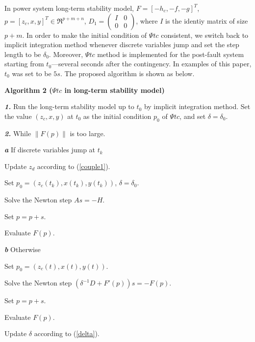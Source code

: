 \documentclass[journal]{IEEEtran}
\begin{document}
In power system long-term stability model, $F=[-h_c,-f,-g]^T$, $p=[z_c,x,y]^T\in\Re^{p+m+n}$, $D_1=\left(\begin{array}{cc}I&0\\0&0\end{array}\right)$, where $I$ is the identiy matrix of size $p+m$. In order to make the initial condition of $\Psi tc$ consistent, we switch back to implicit integration method whenever discrete variables jump and set the step length to be $\delta_{0}$. Moreover, $\Psi tc$ method is implemented for the post-fault system starting from $t_0$---several seconds after the contingency. In examples of this paper, $t_0$ was set to be $5s$. The proposed algorithm is shown as below.
\begin{IEEEdescription}
\item[\textbf{Algorithm 2 ($\Psi tc$ in long-term stability model)}]
\item[\textbf{\textit{1.}}] Run the long-term stability model up to $t_0$ by implicit integration method. Set the value $(z_c,x,y)$ at $t_0$ as the initial condition $p_0$ of $\Psi tc$, and set $\delta=\delta_0$.
\item[\textbf{\textit{2.}}] While $\|F(p)\|$ is too large.
\begin{LaTeXdescription}
\item[\textbf{\textit{a}}] If discrete variables jump at $t_k$
\begin{LaTeXdescription}
\item[\textbf{\textit{ }}]              Update $z_d$ according to (\ref{couple1}).
\item[\textbf{\textit{ }}]              Set $p_0=(z_c(t_k),x(t_k),y(t_k))$, $\delta=\delta_0$.
\item[\textbf{\textit{ }}]              Solve the Newton step $As=-H$.
\item[\textbf{\textit{ }}]              Set $p=p+s$.
\item[\textbf{\textit{ }}]              Evaluate $F(p)$.
\end{LaTeXdescription}
\item[\textbf{\textit{b}}] Otherwise
\begin{LaTeXdescription}
\item[\textbf{\textit{ }}] Set $p_0=(z_c(t),x(t),y(t))$.
\item[\textbf{\textit{ }}] Solve the Newton step $(\delta^{-1}D+F'(p))s=-F(p)$.
\item[\textbf{\textit{ }}] Set $p=p+s$.
\item[\textbf{\textit{ }}] Evaluate $F(p)$.
\item[\textbf{\textit{ }}] Update $\delta$ according to (\ref{delta}).
\end{LaTeXdescription}
\end{LaTeXdescription}
\end{IEEEdescription}
\end{document}
